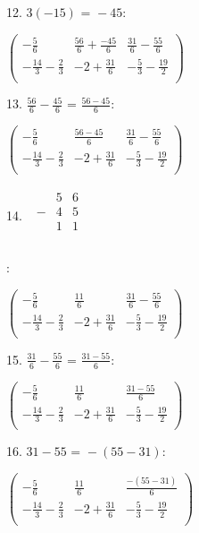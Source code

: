 \documentclass{article}
\begin{document}
12. $3 (-15)\text{ = }-45:$

$\left(
\begin{array}{ccc}
-\frac{5}{6} & \frac{56}{6}+\frac{-45}{6} & \frac{31}{6}-\frac{55}{6} \\
 -\frac{14}{3}-\frac{2}{3} & -2+\frac{31}{6} & -\frac{5}{3}-\frac{19}{2} \\
\end{array}
\right)$

13. $\frac{56}{6}-\frac{45}{6}\text{ = }\frac{56-45}{6}$:

$\left(
\begin{array}{ccc}
-\frac{5}{6} & \frac{56-45}{6} & \frac{31}{6}-\frac{55}{6} \\
 -\frac{14}{3}-\frac{2}{3} & -2+\frac{31}{6} & -\frac{5}{3}-\frac{19}{2} \\
\end{array}
\right)$

14. $\begin{array}{c}
\begin{array}{ccc}
\text{ }& 5 & 6 \\
 - & 4 & 5 \\
\hline
\text{  }& 1 & 1 \\
\end{array}
 \\
\end{array}$

:

$\left(
\begin{array}{ccc}
-\frac{5}{6} & \frac{11}{6} & \frac{31}{6}-\frac{55}{6} \\
 -\frac{14}{3}-\frac{2}{3} & -2+\frac{31}{6} & -\frac{5}{3}-\frac{19}{2} \\
\end{array}
\right)$

15. $\frac{31}{6}-\frac{55}{6}\text{ = }\frac{31-55}{6}$:

$\left(
\begin{array}{ccc}
-\frac{5}{6} & \frac{11}{6} & \frac{31-55}{6} \\
 -\frac{14}{3}-\frac{2}{3} & -2+\frac{31}{6} & -\frac{5}{3}-\frac{19}{2} \\
\end{array}
\right)$

16. $31-55\text{ = }-(55-31):$

$\left(
\begin{array}{ccc}
-\frac{5}{6} & \frac{11}{6} & \frac{-(55-31)}{6} \\
 -\frac{14}{3}-\frac{2}{3} & -2+\frac{31}{6} & -\frac{5}{3}-\frac{19}{2} \\
\end{array}
\right)$
\end{document}
